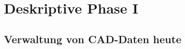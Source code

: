 
\section{Deskriptive Phase I}
\label{kap:DeskriptivePhaseI}

\subsection{Verwaltung von CAD-Daten heute}
\label{kap:CADheute}


\clearpage
